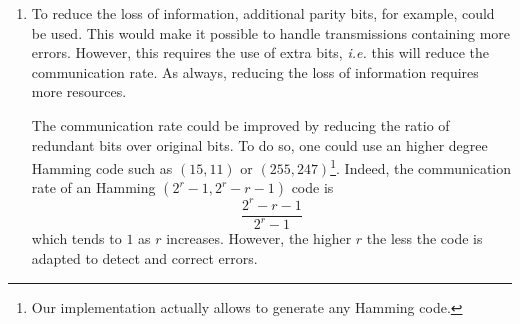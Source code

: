 \documentclass[a4paper, 12pt]{article}
\begin{document}
\begin{enumerate}[leftmargin=*]
        
        \item To reduce the loss of information, additional parity bits, for example, could be used. This would make it possible to handle transmissions containing more errors. However, this requires the use of extra bits, \emph{i.e.} this will reduce the communication rate. As always, reducing the loss of information requires more resources.
        
        The communication rate could be improved by reducing the ratio of redundant bits over original bits. To do so, one could use an higher degree Hamming code such as $(15, 11)$ or $(255, 247)$\footnote{Our implementation actually allows to generate any Hamming code.}. Indeed, the communication rate of an Hamming $(2^r - 1, 2^r - r - 1)$ code is $$\frac{2^r - r - 1}{2^r - 1}$$ which tends to $1$ as $r$ increases. However, the higher $r$ the less the code is adapted to detect and correct errors.
    \end{enumerate}
    
    \newpage
    \printbibliography
    
\end{document}
